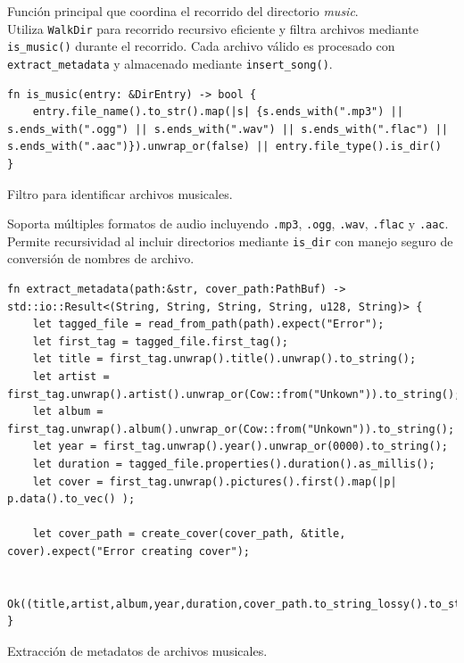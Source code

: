 \documentclass[11pt, a4paper]{article}
\begin{document}
            Función principal que coordina el recorrido del directorio \textit{music}. \\

            Utiliza \texttt{WalkDir} para recorrido recursivo eficiente y filtra archivos mediante \texttt{is\_music()} durante el recorrido. Cada archivo válido es procesado con \texttt{extract\_metadata} y almacenado mediante \texttt{insert\_song()}.

            \begin{lstlisting}[caption={fn is\_music()}]
fn is_music(entry: &DirEntry) -> bool {
    entry.file_name().to_str().map(|s| {s.ends_with(".mp3") || s.ends_with(".ogg") || s.ends_with(".wav") || s.ends_with(".flac") || s.ends_with(".aac")}).unwrap_or(false) || entry.file_type().is_dir()
}
            \end{lstlisting}

            Filtro para identificar archivos musicales.

            Soporta múltiples formatos de audio incluyendo \texttt{.mp3}, \texttt{.ogg}, \texttt{.wav}, \texttt{.flac} y \texttt{.aac}. Permite recursividad al incluir directorios mediante \texttt{is\_dir} con manejo seguro de conversión de nombres de archivo.

            \begin{lstlisting}[caption={fn extract\_metadata()}]
fn extract_metadata(path:&str, cover_path:PathBuf) -> std::io::Result<(String, String, String, String, u128, String)> {
    let tagged_file = read_from_path(path).expect("Error");
    let first_tag = tagged_file.first_tag();
    let title = first_tag.unwrap().title().unwrap().to_string();
    let artist = first_tag.unwrap().artist().unwrap_or(Cow::from("Unkown")).to_string();
    let album = first_tag.unwrap().album().unwrap_or(Cow::from("Unkown")).to_string();
    let year = first_tag.unwrap().year().unwrap_or(0000).to_string();
    let duration = tagged_file.properties().duration().as_millis();
    let cover = first_tag.unwrap().pictures().first().map(|p| p.data().to_vec() );

    let cover_path = create_cover(cover_path, &title, cover).expect("Error creating cover");

    Ok((title,artist,album,year,duration,cover_path.to_string_lossy().to_string()))
}
            \end{lstlisting}

            Extracción de metadatos de archivos musicales. \\
\end{document}

